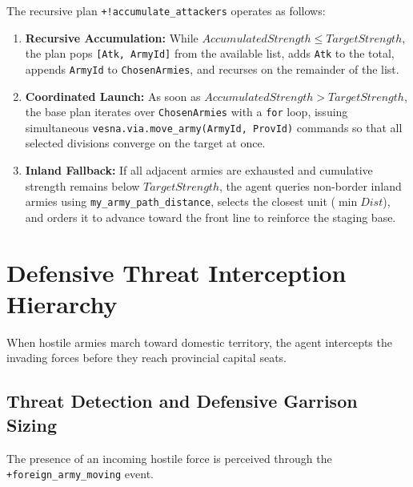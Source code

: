 The recursive plan \texttt{+!accumulate\_attackers} operates as follows:
\begin{enumerate}[label=\alph*)]
    \item \textbf{Recursive Accumulation:} While $\mathit{AccumulatedStrength} \le \mathit{TargetStrength}$, the plan pops \texttt{[Atk, ArmyId]} from the available list, adds \texttt{Atk} to the total, appends \texttt{ArmyId} to \texttt{ChosenArmies}, and recurses on the remainder of the list.
    \item \textbf{Coordinated Launch:} As soon as $\mathit{AccumulatedStrength} > \mathit{TargetStrength}$, the base plan iterates over \texttt{ChosenArmies} with a \texttt{for} loop, issuing simultaneous \texttt{vesna.via.move\_army(ArmyId, ProvId)} commands so that all selected divisions converge on the target at once.
    \item \textbf{Inland Fallback:} If all adjacent armies are exhausted and cumulative strength remains below $\mathit{TargetStrength}$, the agent queries non-border inland armies using \texttt{my\_army\_path\_distance}, selects the closest unit ($\min \mathit{Dist}$), and orders it to advance toward the front line to reinforce the staging base.
\end{enumerate}

\section{Defensive Threat Interception Hierarchy}
\label{sec:impl_defense_hierarchy}

When hostile armies march toward domestic territory, the agent intercepts the invading forces before they reach provincial capital seats.

\subsection{Threat Detection and Defensive Garrison Sizing}
\label{subsec:threat_sizing}

The presence of an incoming hostile force is perceived through the \texttt{+foreign\_army\_moving} event.

